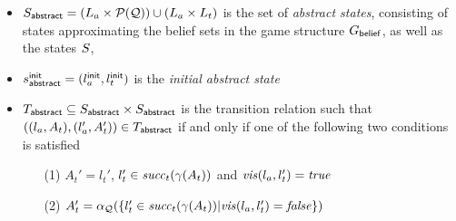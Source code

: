 \begin{itemize}
\item $S_{\mathsf{abstract}} = (L_a \times \mathcal P(\mathcal{Q})) \cup (L_a \times L_t)$  is the set of \emph{abstract states}, consisting of states approximating the belief sets in the game structure $G_{\mathsf{belief}}$, as well as the states $S$,
\item $s^{\mathsf{init}}_{\mathsf{abstract}} = (l_a^{\mathsf{init}},l_t^{\mathsf{init}})$ is the \emph{initial abstract state}
\item $T_{\mathsf{abstract}} \subseteq S_{\mathsf{abstract}} \times S_{\mathsf{abstract}}$ is the transition relation such that $((l_a, A_t),(l_a', A_t')) \in T_{\mathsf{abstract}}$ if and only if one of the following two conditions is satisfied
\begin{itemize}
\item[(1)] $A_t' = l_t'$, $l_t' \in \mathit{succ}_t(\gamma(A_t))$ and $\mathit{vis}(l_a,l_t') = \mathit{true}$

\item[(2)] $A_t' = \alpha_{\mathcal{Q}}(\{l_t' \in \mathit{succ}_t(\gamma(A_t))  |  \mathit{vis}(l_a,l_t') = \mathit{false}\})$




\end{itemize}
\end{itemize}
